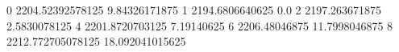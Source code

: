 0 2204.52392578125 9.84326171875
1 2194.6806640625 0.0
2 2197.263671875 2.5830078125
4 2201.8720703125 7.19140625
6 2206.48046875 11.7998046875
8 2212.772705078125 18.092041015625
